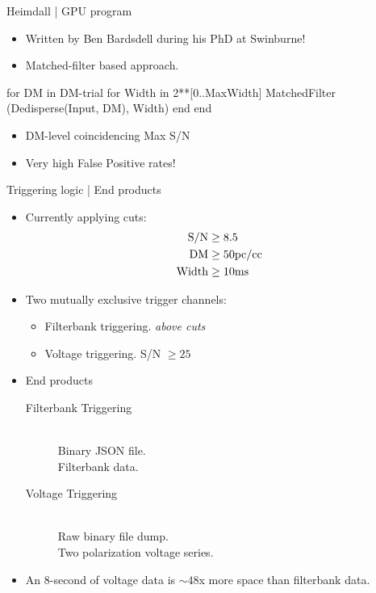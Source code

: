 \begin{frame}{Heimdall | GPU program}
	\begin{itemize}
		\item Written by Ben Bardsdell during his PhD at Swinburne!
		\item Matched-filter based approach. 
	\end{itemize}
	\begin{listing}
		for DM in DM-trial
			for Width in 2**[0..MaxWidth] 
				MatchedFilter (Dedisperse(Input, DM), Width)
			end
		end
	\end{listing}
	\begin{itemize}
		\item DM-level coincidencing \hfill Max S/N
		\item Very high False Positive rates!
	\end{itemize}
\end{frame}

\begin{frame}{Triggering logic | End products}
	\begin{itemize}
		\item Currently applying cuts: 
		\begin{align}
			{\rm S/N} &\geq 8.5 \\
			{\rm DM}  &\geq 50 {\rm pc/cc} \\
			{\rm Width} &\geq 10 {\rm ms}
		\end{align}
		\item Two mutually exclusive trigger channels: 
			\begin{itemize}
				\item Filterbank triggering. \hfill \emph{above cuts}
				\item Voltage triggering. \hfill S/N $\geq 25$
			\end{itemize}
		\item End products
			\begin{description}
				\item[Filterbank Triggering] \\ 
					Binary JSON file. \\
					Filterbank data.
				\item[Voltage Triggering] \\
					Raw binary file dump. \\
					Two polarization voltage series.
			\end{description}
		\item An $8$-second of voltage data is $\sim 48$x more space than filterbank data.
	\end{itemize}
\end{frame}

